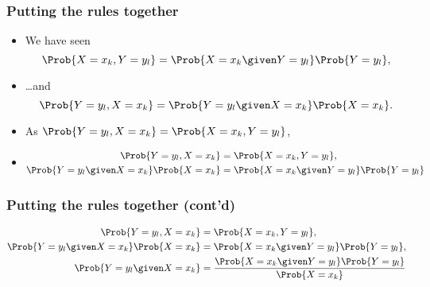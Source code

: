 \documentclass[10pt,xcolor=dvipsnames,serif,professionalfont]{beamer} %
\begin{document}
\begin{frame}
\frametitle{Putting the rules together}
\begin{itemize}
\item We have seen
\begin{equation}
\Prob{X=x_k,Y=y_l} = \Prob{X=x_k\given Y=y_l}\Prob{Y=y_l},
\end{equation}
\item \ldots and 
\begin{equation}
\Prob{Y=y_l,X=x_k} = \Prob{Y=y_l \given X=x_k}\Prob{X=x_k}.
\end{equation}
\item As $\Prob{Y=y_l,X=x_k} = \Prob{X=x_k,Y=y_l}$, 
\item 
\begin{align}
\Prob{Y=y_l,X=x_k} &= \Prob{X=x_k,Y=y_l},\\
\Prob{Y=y_l \given X=x_k}\Prob{X=x_k} &= \Prob{X=x_k\given Y=y_l}\Prob{Y=y_l}
\end{align}
%
\end{itemize}
\end{frame}

\begin{frame}
\frametitle{Putting the rules together (cont'd)}
\begin{align}
\Prob{Y=y_l,X=x_k} &= \Prob{X=x_k,Y=y_l},\\
\Prob{Y=y_l \given X=x_k}\Prob{X=x_k} &= \Prob{X=x_k\given Y=y_l}\Prob{Y=y_l},\\
\Prob{Y=y_l \given X=x_k} &= \frac{ \Prob{X=x_k\given Y=y_l}\Prob{Y=y_l} } { \Prob{X=x_k} }
\end{align}
\end{frame}
\end{document}
